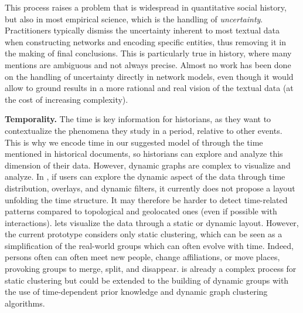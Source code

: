 This process raises a problem that is widespread in quantitative social history, but also in most empirical science, which is the handling of \emph{uncertainty}.
Practitioners typically dismiss the uncertainty inherent to most textual data when constructing networks and encoding specific entities, thus removing it in the making of final conclusions.
This is particularly true in history, where many mentions are ambiguous and not always precise\cite{dufournaudRechercheEmpiriqueHistoire2015}.
Almost no work has been done on the handling of uncertainty directly in network models\cite{adarManagingUncertaintySocial}, even though it would allow to ground results in a more rational and real vision of the textual data (at the cost of increasing complexity).

\noindent\textbf{Temporality.} The time is key information for historians, as they want to contextualize the phenomena they study in a period, relative to other events.
This is why we encode time in our suggested model of \modelplural through the time mentioned in historical documents, so historians can explore and analyze this dimension of their data.
However, dynamic graphs are complex to visualize and analyze.
In \combinet, if users can explore the dynamic aspect of the data through time distribution, overlays, and dynamic filters, it currently does not propose a layout unfolding the time structure.
It may therefore be harder to detect time-related patterns compared to topological and geolocated ones (even if possible with interactions).
\pkclustering lets visualize the data through a static or dynamic layout.
However, the current prototype considers only static clustering, which can be seen as a simplification of the real-world groups which can often evolve with time\cite{rossettiCommunityDiscoveryDynamic2018}.
Indeed, persons often can often meet new people, change affiliations, or move places, provoking groups to merge, split, and disappear.
\pkclustering is already a complex process for static clustering but could be extended to the building of dynamic groups with the use of time-dependent prior knowledge and dynamic graph clustering algorithms.

